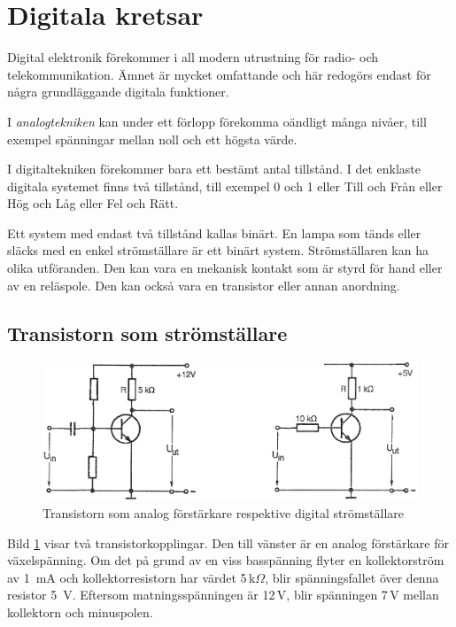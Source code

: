 \section{Digitala kretsar}
\label{digitala kretsar}

Digital elektronik förekommer i all modern utrustning för radio- och
telekommunikation. Ämnet är mycket omfattande och här redogörs endast
för några grundläggande digitala funktioner.

I \emph{analogtekniken} kan under ett förlopp förekomma oändligt många
nivåer, till exempel spänningar mellan noll och ett högsta värde.

I digitaltekniken förekommer bara ett bestämt antal tillstånd. I det
enklaste digitala systemet finns två tillstånd, till exempel 0 och 1
eller Till och Från eller Hög och Låg eller Fel och Rätt.

Ett system med endast två tillstånd kallas binärt. En lampa som tänds
eller släcks med en enkel strömställare är ett binärt system.
Strömställaren kan ha olika utföranden. Den kan vara en mekanisk
kontakt som är styrd för hand eller av en reläspole. Den kan också
vara en transistor eller annan anordning.

\subsection{Transistorn som strömställare}

\begin{figure}
\includegraphics[width=\textwidth]{images/cropped_pdfs/bild_2_2-35.pdf}
\caption{Transistorn som analog förstärkare respektive digital strömställare}
\label{fig:BildII2-35}
\end{figure}

Bild \ref{fig:BildII2-35} visar två transistorkopplingar. Den till
vänster är en analog förstärkare för växelspänning. Om det på grund av
en viss basspänning flyter en kollektorström av 1~mA och
kollektorresistorn har värdet 5\,k\(\Omega\), blir spänningsfallet
över denna resistor 5~V. Eftersom matningsspänningen är 12\,V, blir
spänningen 7\,V mellan kollektorn och minuspolen.

